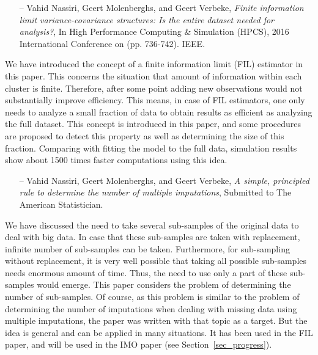 \documentclass[14pt]{article}
\begin{document}
\begin{itemize}
\item[--]{\textsf{Vahid Nassiri, Geert Molenberghs, and Geert Verbeke}}, {\it Finite information limit variance-covariance structures: Is the entire dataset needed for analysis?}, In High Performance Computing \& Simulation (HPCS), 2016 International Conference on (pp. 736-742). IEEE.
\end{itemize}
We have introduced the concept of a finite information limit (FIL) estimator in this paper. This concerns the situation that amount of information within each cluster is finite. Therefore, after some point adding new observations would not substantially improve efficiency. This means, in case of FIL estimators, one only needs to analyze a small fraction of data to obtain results as efficient as analyzing the full dataset. This concept is introduced in this paper, and some procedures are proposed to detect this property as well as determining the size of this fraction. Comparing with fitting the model to the full data, simulation results show about 1500 times faster computations using this idea.


\begin{itemize}
\item[--]{\textsf{Vahid Nassiri, Geert Molenberghs, and Geert Verbeke}}, {\it A simple, principled rule to determine the number of multiple imputations}, Submitted to The American Statistician.
\end{itemize}
We have discussed the need to take several sub-samples of the original data to deal with big data. In case that these sub-samples are taken with replacement, infinite number of sub-samples can be taken. Furthermore, for sub-sampling without replacement, it is very well possible that taking all possible sub-samples needs enormous amount of time. Thus, the need to use only a part of these sub-samples would emerge. This paper considers the problem of determining the number of sub-samples. Of course, as this problem is similar to the problem of determining the number of imputations when dealing with missing data using multiple imputations, the paper was written with that topic as a target. But the idea is general and can be applied in many situations. It has been used in the FIL paper, and will be used in the IMO paper (see Section~\ref{sec_progress}).
\end{document}

